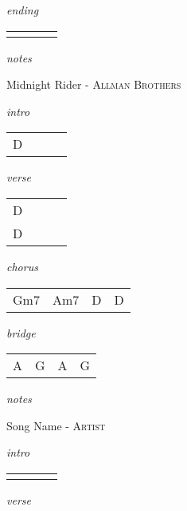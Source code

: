 \documentclass[12pt]{article}
\begin{document}
\textit{ending}

\begin{tabular}{|P{1.25in}|P{1.25in}|P{1.25in}|P{1.25in}|}
    &   &   &   \\
\end{tabular}

\textit{notes}

\newpage

{\Huge Midnight Rider} {\huge - \textsc{Allman Brothers}}

\huge
\textit{intro}

\begin{tabular}{|P{1.25in}|P{1.25in}|P{1.25in}|P{1.25in}|}
  D &   &   &   \\
\end{tabular}

\textit{verse}

\begin{tabular}{|P{1.25in}|P{1.25in}|P{1.25in}|P{1.25in}|}
  D   &   &   &   \\
  D   &   &   &   \\
\end{tabular}

\textit{chorus}

\begin{tabular}{|P{1.25in}|P{1.25in}|P{1.25in}|P{1.25in}|}
  Gm7 & Am7  & D & D \\
\end{tabular}

\textit{bridge}

\begin{tabular}{|P{1.25in}|P{1.25in}|P{1.25in}|P{1.25in}|}
  A & G  &  A &  G \\
\end{tabular}

\textit{notes}

\newpage



{\Huge Song Name} {\huge - \textsc{Artist}}

\huge
\textit{intro}

\begin{tabular}{|P{1.25in}|P{1.25in}|P{1.25in}|P{1.25in}|}
    &   &   &   \\
\end{tabular}

\textit{verse}
\end{document}
